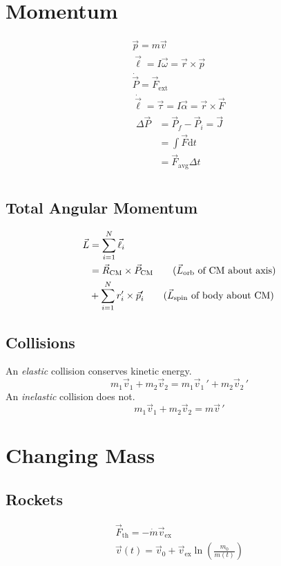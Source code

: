 \documentclass{cheatsheet}
\begin{document}
	\section{Momentum}
	\begin{gather*}
		\vec p = m\vec v	\tag{momentum}\\
		\vec\ell = I\vec\omega = \vec r \times \vec p	\tag{rot. form}\\
		\dot{\vec P} = \vec F_\mathrm{ext} \tag{3rd law}\\
		\dot{\vec\ell} = \vec\tau = I\vec\alpha= \vec r \times \vec F	\tag{rot. form}\\
		\begin{split}
				\Delta\vec P &= \vec P_f - \vec P_i = \vec J	\\
			&= \int \vec F \mathrm{d}t	\\
			&= \vec F_\text{avg}\Delta t
		\end{split}\tag{impulse}\\
	\end{gather*}
		\subsection{Total Angular Momentum}
		\begin{align*}
			\vec L &= \sum_{i=1}^{N} \vec\ell_i	\\
			&= \vec R_\text{CM} \times \vec P_\text{CM}	\tag{$\vec L_\text{orb}$ of CM about axis}\\
			&+ \sum_{i=1}^{N} r_i' \times \vec p_i'		\tag{$\vec L_\text{spin}$ of body about CM}
		\end{align*}
		\subsection{Collisions}
			An \emph{elastic} collision conserves kinetic energy.
			\[
				m_1\vec v_1 + m_2\vec v_2 = m_1\vec v_1\,' + m_2\vec v_2\,'
			\]
			An \emph{inelastic} collision does not.
			\[
				m_1\vec v_1 + m_2\vec v_2 = m\vec v\,'
			\]
	\section{Changing Mass}
		\subsection{Rockets}
			\begin{gather*}
				\vec F_\mathrm{th} = -\dot{m}\vec v_\mathrm{ex}		\tag{thrust}\\
				\vec v(t) = \vec v_0 + \vec v_\mathrm{ex}\ln\left( \frac{m_0}{m(t)} \right)	\tag{$\Delta V$}
			\end{gather*}
\end{document}
